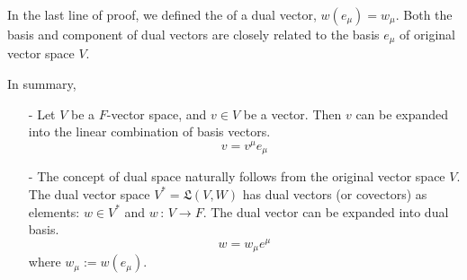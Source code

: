 \documentclass[a4paper, 10pt]{article}
\begin{document}

\begin{remark}
    In the last line of proof, we defined the  of a dual vector, $w(e_{\mu}) = w_{\mu}$. Both the basis and component of dual vectors are closely related to the basis $e_{\mu}$ of original vector space $V$.
\end{remark}

In summary,
\begin{itemize}
    \item[-] Let $V$ be a $F$-vector space, and $v \in V$ be a vector. Then $v$ can be expanded into the linear combination of basis vectors.
    \[ \boxed{v = v^{\mu} e_{\mu}} \]
    \item[-] The concept of dual space naturally follows from the original vector space $V$. The dual vector space $V^{\ast} = \mathfrak{L}(V,W)$ has dual vectors (or covectors) as elements: $w \in V^{\ast}$ and $w \,:\, V \rightarrow F$. The dual vector can be expanded into dual basis.
    \[ \boxed{w = w_{\mu} e^{\mu}} \]
    where $w_{\mu} := w(e_{\mu})$.
\end{itemize}
\end{document}
